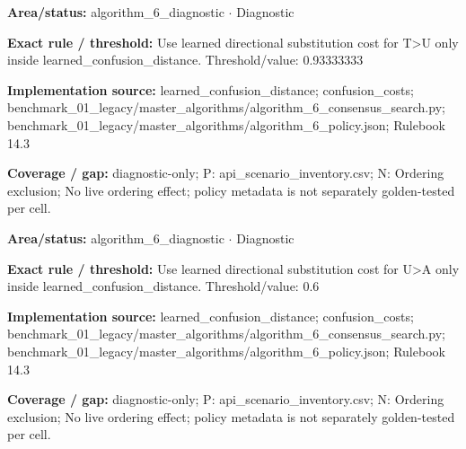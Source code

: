 \begin{tcolorbox}[enhanced,breakable,colback=white,colframe=Muted!45,boxrule=0.45pt,arc=1.5pt,left=6pt,right=6pt,top=5pt,bottom=5pt,title={\texttt{A6-LEARNED-SUBSTITUTION-T-U}},title after break={\texttt{A6-LEARNED-SUBSTITUTION-T-U}\ (continued)},fonttitle=\headingfont\bfseries\color{Navy},coltitle=Navy]
\textbf{Area/status:} algorithm\_\allowbreak{}6\_\allowbreak{}diagnostic $\boldsymbol{\cdot}$ Diagnostic\par
\smallskip
\textbf{Exact rule / threshold:} Use learned directional substitution cost for T>U only inside learned\_\allowbreak{}confusion\_\allowbreak{}distance. Threshold/\allowbreak{}value: 0.93333333\par
\smallskip
\textbf{Implementation source:} learned\_\allowbreak{}confusion\_\allowbreak{}distance; confusion\_\allowbreak{}costs; benchmark\_\allowbreak{}01\_\allowbreak{}legacy/\allowbreak{}master\_\allowbreak{}algorithms/\allowbreak{}algorithm\_\allowbreak{}6\_\allowbreak{}consensus\_\allowbreak{}search.py; benchmark\_\allowbreak{}01\_\allowbreak{}legacy/\allowbreak{}master\_\allowbreak{}algorithms/\allowbreak{}algorithm\_\allowbreak{}6\_\allowbreak{}policy.json; Rulebook 14.3\par
\smallskip
\textbf{Coverage / gap:} diagnostic-only; P: api\_\allowbreak{}scenario\_\allowbreak{}inventory.csv; N: Ordering exclusion; No live ordering effect; policy metadata is not separately golden-tested per cell.
\end{tcolorbox}
\begin{tcolorbox}[enhanced,breakable,colback=white,colframe=Muted!45,boxrule=0.45pt,arc=1.5pt,left=6pt,right=6pt,top=5pt,bottom=5pt,title={\texttt{A6-LEARNED-SUBSTITUTION-U-A}},title after break={\texttt{A6-LEARNED-SUBSTITUTION-U-A}\ (continued)},fonttitle=\headingfont\bfseries\color{Navy},coltitle=Navy]
\textbf{Area/status:} algorithm\_\allowbreak{}6\_\allowbreak{}diagnostic $\boldsymbol{\cdot}$ Diagnostic\par
\smallskip
\textbf{Exact rule / threshold:} Use learned directional substitution cost for U>A only inside learned\_\allowbreak{}confusion\_\allowbreak{}distance. Threshold/\allowbreak{}value: 0.6\par
\smallskip
\textbf{Implementation source:} learned\_\allowbreak{}confusion\_\allowbreak{}distance; confusion\_\allowbreak{}costs; benchmark\_\allowbreak{}01\_\allowbreak{}legacy/\allowbreak{}master\_\allowbreak{}algorithms/\allowbreak{}algorithm\_\allowbreak{}6\_\allowbreak{}consensus\_\allowbreak{}search.py; benchmark\_\allowbreak{}01\_\allowbreak{}legacy/\allowbreak{}master\_\allowbreak{}algorithms/\allowbreak{}algorithm\_\allowbreak{}6\_\allowbreak{}policy.json; Rulebook 14.3\par
\smallskip
\textbf{Coverage / gap:} diagnostic-only; P: api\_\allowbreak{}scenario\_\allowbreak{}inventory.csv; N: Ordering exclusion; No live ordering effect; policy metadata is not separately golden-tested per cell.
\end{tcolorbox}
